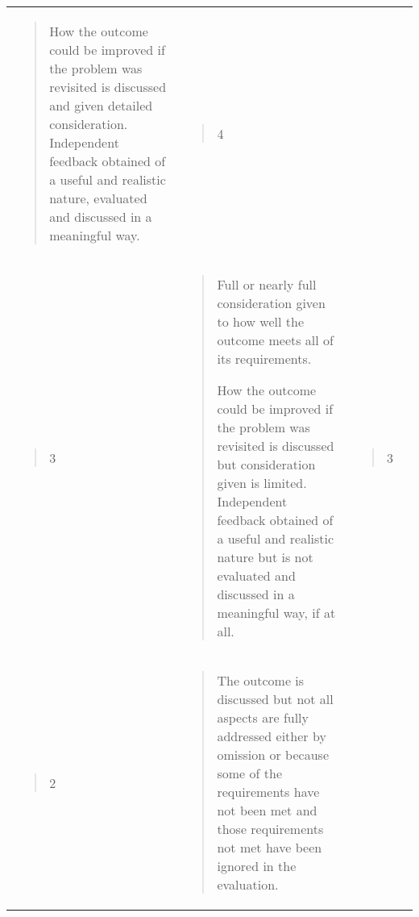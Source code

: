 \documentclass[
]{article}
\begin{document}
\begin{longtable}[]{@{}llll@{}}
\begin{minipage}[t]{0.22\columnwidth}
\begin{quote}
How the outcome could be improved if the problem was revisited is
discussed and given detailed consideration. Independent feedback
obtained of a useful and realistic nature, evaluated and discussed in a
meaningful way.
\end{quote}\strut
\end{minipage} & \begin{minipage}[t]{0.22\columnwidth}\raggedright
\begin{quote}
4
\end{quote}\strut
\end{minipage} & \begin{minipage}[t]{0.22\columnwidth}\raggedright
\strut
\end{minipage}\tabularnewline
\begin{minipage}[t]{0.22\columnwidth}\raggedright
\begin{quote}
3
\end{quote}\strut
\end{minipage} & \begin{minipage}[t]{0.22\columnwidth}\raggedright
\begin{quote}
Full or nearly full consideration given to how well the outcome meets
all of its requirements.

How the outcome could be improved if the problem was revisited is
discussed but consideration given is limited. Independent feedback
obtained of a useful and realistic nature but is not evaluated and
discussed in a meaningful way, if at all.
\end{quote}\strut
\end{minipage} & \begin{minipage}[t]{0.22\columnwidth}\raggedright
\begin{quote}
3
\end{quote}\strut
\end{minipage} & \begin{minipage}[t]{0.22\columnwidth}\raggedright
\strut
\end{minipage}\tabularnewline
\begin{minipage}[t]{0.22\columnwidth}\raggedright
\begin{quote}
2
\end{quote}\strut
\end{minipage} & \begin{minipage}[t]{0.22\columnwidth}\raggedright
\begin{quote}
The outcome is discussed but not all aspects are fully addressed either
by omission or because some of the requirements have not been met and
those requirements not met have been ignored in the evaluation.


\end{quote}
\end{minipage}
\end{longtable}
\end{document}
